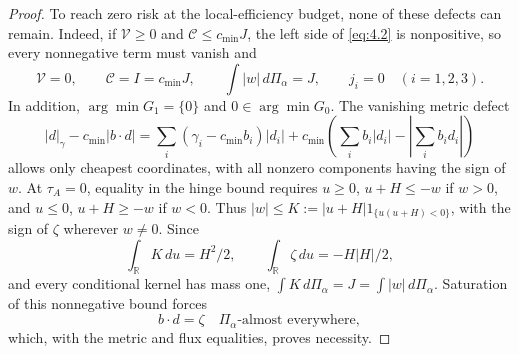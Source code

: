 \begin{proof}


To reach zero risk at the local-efficiency budget, none of these defects can remain. Indeed, if \(\mathcal V\ge0\) and \(\mathcal C\le c_{\min}J\), the left side of \eqref{eq:4.2} is nonpositive, so every nonnegative term must vanish and
\begin{equation}
\mathcal V=0,\qquad \mathcal C=I=c_{\min}J,\qquad
\int|w|\,d\Pi_\alpha=J,\qquad j_i=0\quad(i=1,2,3).
\tag{4.3}\label{eq:4.3}
\end{equation}
In addition, \(\arg\min G_1=\{0\}\) and \(0\in\arg\min G_0\). The vanishing metric defect
\begin{equation}
|d|_\gamma-c_{\min}|b\cdot d|
=\sum_i(\gamma_i-c_{\min}b_i)|d_i|
+c_{\min}\left(\sum_i b_i|d_i|-\left|\sum_i b_id_i\right|\right)
\tag{4.4}\label{eq:4.4}
\end{equation}
allows only cheapest coordinates, with all nonzero components having the sign of \(w\). At \(\tau_A=0\), equality in the hinge bound requires \(u\ge0\), \(u+H\le-w\) if \(w>0\), and \(u\le0\), \(u+H\ge-w\) if \(w<0\). Thus \(|w|\le K:=|u+H|1_{\{u(u+H)<0\}}\), with the sign of \(\zeta\) wherever \(w\ne0\). Since
\begin{equation}
\int_{\mathbb R}K\,du=H^2/2,\qquad
\int_{\mathbb R}\zeta\,du=-H|H|/2,
\tag{4.5}\label{eq:4.5}
\end{equation}
and every conditional kernel has mass one, \(\int K\,d\Pi_\alpha=J=\int|w|\,d\Pi_\alpha\). Saturation of this nonnegative bound forces
\begin{equation}
b\cdot d=\zeta\quad\Pi_\alpha\text{-almost everywhere},
\tag{4.6}\label{eq:4.6}
\end{equation}
which, with the metric and flux equalities, proves necessity.


\end{proof}
